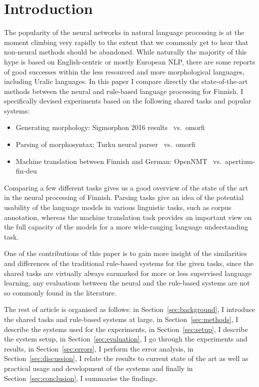 \documentclass[a4paper,notitlepage]{article}
\begin{document}
\section{Introduction}

The popularity of the neural networks in natural language processing is at the
moment climbing very rapidly to the extent that we commonly get to hear that
non-neural methods should be abandoned. While naturally the majority of this
hype is based on English-centric or mostly European NLP, there are some reports
of good successes within the less resourced and more morphological languages,
including Uralic languages. In this paper I compare directly the
state-of-the-art methods between the neural and rule-based language processing
for Finnish. I specifically devised experiments based on the following shared
tasks and popular systems:

\begin{itemize}
    \item Generating morphology: Sigmorphon 2016
        results~\citep{cotterell2016sigmorphon} vs.\
        omorfi~\citep{omorfi}
    \item Parsing of morphosyntax: Turku neural parser~\citep{kanerva2018turku}
        vs.\ omorfi~\citep{omorfi}
    \item Machine translation between Finnish and German:
        OpenNMT~\citep{opennmt} vs.\
        apertium-fin-deu~\citep{pirinen2018rulebased}
\end{itemize}

Comparing a few different tasks gives us a good overview of the state of the art
in the neural processing of Finnish. Parsing tasks give an idea of the potential
usability of the language models in various linguistic tasks, such as corpus
annotation, whereas the machine translation task provides an important view on
the full capacity of the models for a more wide-ranging language understanding
task.

One of the contributions of this paper is to gain more insight of the
similarities and differences of the traditional rule-based systems for the given
tasks, since the shared tasks are virtually always earmarked for more or less
supervised language learning, any evaluations between the neural and the
rule-based systems are not so commonly found in the literature.

The rest of article is organised as follows: in Section~\ref{sec:background},
I introduce the shared tasks and rule-based systems at large, in
Section~\ref{sec:methods}, I describe the systems used for the experiments,
in Section~\ref{sec:setup}, I describe the system setup, in
Section~\ref{sec:evaluation}, I go through the experiments and results,
in Section~\ref{sec:errors}, I perform the error analysis, in
Section~\ref{sec:discussion}, I relate the results to current state of the
art as well as practical usage and development of the systems and finally
in Section~\ref{sec:conclusion}, I summarise the findings.
\end{document}

